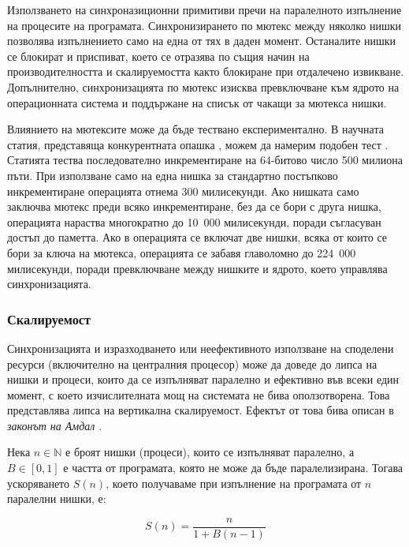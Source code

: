 Използването на синхроназиционни примитиви пречи на паралелното изпълнение на процесите на програмата. Синхронизирането по мютекс между няколко нишки позволява изпълнението само на една от тях в даден момент. Останалите нишки се блокират и приспиват, което се отразява по същия начин на производителността и скалируемостта както блокиране при отдалечено извикване. Допълнително, синхронизацията по мютекс изисква превключване към ядрото на операционната система и поддържане на списък от чакащи за мютекса нишки.

Влиянието на мютексите може да бъде тествано експериментално. В научната статия, представяща конкурентната опашка , можем да намерим подобен тест \cite{thompson2011Disruptor}. Статията тества последователно инкрементиране на 64-битово число 500 милиона пъти. При използване само на една нишка за стандартно постъпково инкрементиране операцията отнема 300 милисекунди. Ако нишката само заключва мютекс преди всяко инкрементиране, без да се бори с друга нишка, операцията нараства многократно до 10~000 милисекунди, поради съгласуван достъп до паметта. Ако в операцията се включат две нишки, всяка от които се бори за ключа на мютекса, операцията се забавя главоломно до 224~000 милисекунди, поради превключване между нишките и ядрото, което управлява синхронизацията.

\subsubsection{Скалируемост}

Синхронизацията и изразходването или неефективното използване на споделени ресурси (включително на централния процесор) може да доведе до липса на нишки и процеси, които да се изпълняват паралелно и ефективно във всеки един момент, с което изчислителната мощ на системата не бива оползотворена. Това представлява липса на вертикална скалируемост. Ефектът от това бива описан в \emph{законът на Амдал} \cite{amdahl1967Law}.

Нека $n \in \mathbb{N}$ е броят нишки (процеси), които се изпълняват паралелно, а $B \in [0, 1]$ е частта от програмата, която не може да бъде паралелизирана. Тогава ускоряването $S(n)$, което получаваме при изпълнение на програмата от $n$ паралелни нишки, е:

\begin{equation}
  S(n) = \frac{n}{1 + B(n - 1)}
\end{equation}

